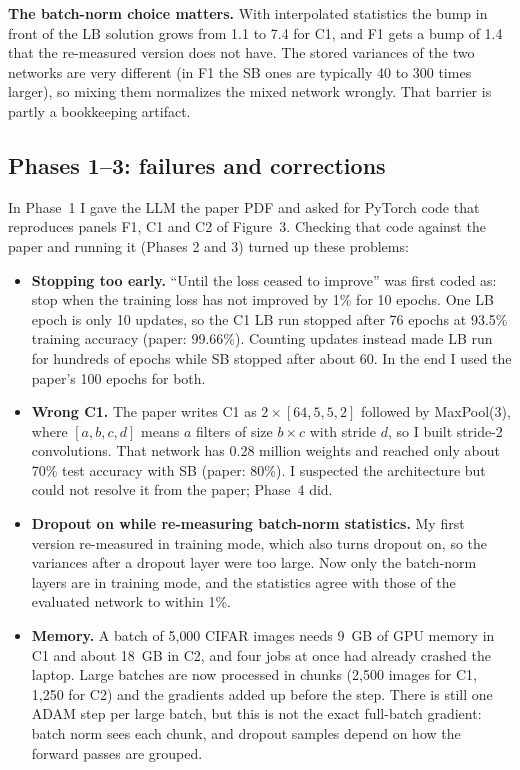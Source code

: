 \textbf{The batch-norm choice matters.} With interpolated statistics the bump in front of the LB solution grows from 1.1 to 7.4 for C1, and F1 gets a bump of 1.4 that the re-measured version does not have. The stored variances of the two networks are very different (in F1 the SB ones are typically 40 to 300 times larger), so mixing them normalizes the mixed network wrongly. That barrier is partly a bookkeeping artifact.

\subsection{Phases 1--3: failures and corrections}
In Phase~1 I gave the LLM the paper PDF and asked for PyTorch code that reproduces panels F1, C1 and C2 of Figure~3. Checking that code against the paper and running it (Phases 2 and 3) turned up these problems:
\begin{itemize}
\item \textbf{Stopping too early.} ``Until the loss ceased to improve'' was first coded as: stop when the training loss has not improved by 1\% for 10 epochs. One LB epoch is only 10 updates, so the C1 LB run stopped after 76 epochs at 93.5\% training accuracy (paper: 99.66\%). Counting updates instead made LB run for hundreds of epochs while SB stopped after about 60. In the end I used the paper's 100 epochs for both.
\item \textbf{Wrong C1.} The paper writes C1 as $2\times[64,5,5,2]$ followed by MaxPool(3), where $[a,b,c,d]$ means $a$ filters of size $b\times c$ with stride $d$, so I built stride-2 convolutions. That network has 0.28 million weights and reached only about 70\% test accuracy with SB (paper: 80\%). I suspected the architecture but could not resolve it from the paper; Phase~4 did.
\item \textbf{Dropout on while re-measuring batch-norm statistics.} My first version re-measured in training mode, which also turns dropout on, so the variances after a dropout layer were too large. Now only the batch-norm layers are in training mode, and the statistics agree with those of the evaluated network to within 1\%.
\item \textbf{Memory.} A batch of 5{,}000 CIFAR images needs 9~GB of GPU memory in C1 and about 18~GB in C2, and four jobs at once had already crashed the laptop. Large batches are now processed in chunks (2{,}500 images for C1, 1{,}250 for C2) and the gradients added up before the step. There is still one ADAM step per large batch, but this is not the exact full-batch gradient: batch norm sees each chunk, and dropout samples depend on how the forward passes are grouped.
\end{itemize}

